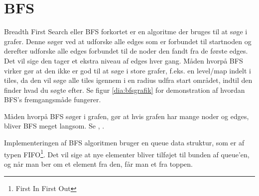 \section{BFS}
Breadth First Search eller BFS forkortet er en algoritme der bruges til at søge i grafer. Denne søger ved at udforske alle edges som er forbundet til startnoden og derefter udforske alle edges forbundet til de noder den fandt fra de første edges. Det vil sige den tager et ekstra niveau af edges hver gang. Måden hvorpå BFS virker gør at den ikke er god til at søge i store grafer, f.eks. en level/map indelt i tiles, da den vil søge alle tiles igennem i en radius udfra start området, indtil den finder hvad du søgte efter. Se figur \ref{dia:bfsgrafik} for demonstration af hvordan BFS's fremgangsmåde fungerer.


Måden hvorpå BFS søger i grafen, gør at hvis grafen har mange noder og edges, bliver BFS meget langsom. Se \textcite[230]{buckland}, \textcite{amitastar}.

Implementeringen af BFS algoritmen bruger en queue data struktur, som er af typen FIFO\footnote{First In First Out}. Det vil sige at nye elementer bliver tilføjet til bunden af queue'en, og når man ber om et element fra den, får man et fra toppen.